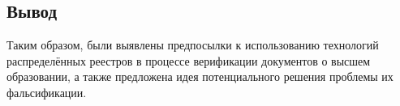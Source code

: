 \documentclass{mirea-article}
\begin{document}
\begin{figure}[htb]
    \centering
    \setlength\fboxsep{2pt} %
    \setlength\fboxrule{0.5pt} %
    \begin{minipage}{.5\textwidth}
        \centering
        \label{fig:diploma-verify}
    \end{minipage}%
    \begin{minipage}{.5\textwidth}
        \centering
        \label{fig:token-creation}
    \end{minipage}
\end{figure}


\subsection*{Вывод}

Таким образом, были выявлены предпосылки к использованию технологий распределённых реестров в процессе верификации документов о высшем образовании, а также предложена идея потенциального решения проблемы их фальсификации.
\end{document}
